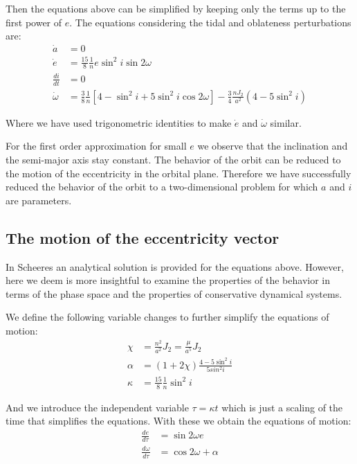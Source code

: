 Then the equations above can be simplified by keeping only the terms up to the first power of $e$. The equations considering the tidal and oblateness perturbations are:
\begin{align}
\dot{a} &= 0\\
\dot{e} &= \frac{15}{8} \frac{1}{n} e \sin^2 i \sin 2\omega\\
\frac{di}{dt} &= 0\\
\dot{\omega} &= \frac{3}{8} \frac{1}{n}\left[4 - \sin^2 i+ 5 \sin^2 i \cos 2\omega \right] -\frac{3}{4} \frac{n J_2 }{a^2} \left(4 - 5 \sin^2 i\right)
\end{align}

Where we have used trigonometric identities to make $\dot{e}$ and $\dot{\omega}$ similar.

For the first order approximation for small $e$ we observe that the inclination and the semi-major axis stay constant. The behavior of the orbit can be reduced to the motion of the eccentricity in the orbital plane. Therefore we have successfully reduced the behavior of the orbit to a two-dimensional problem for which $a$ and $i$ are parameters.

\subsection{The motion of the eccentricity vector}
In Scheeres \cite{scheeres2001stability} an analytical solution is provided for the equations above. However, here we deem is more insightful to examine the properties of the behavior in terms of the phase space and the properties of conservative dynamical systems.

We define the following variable changes to further simplify the equations of motion:
\begin{align}
\chi &= \frac{n^2}{a^2} J_2 = \frac{\mu}{a^5} J_2 \\
\alpha &= (1+ 2\chi) \frac{4 - 5 \sin^2 i}{5 sin^2 i} \\
\kappa &= \frac{15}{8} \frac{1}{n} \sin^2 i
\end{align}

And we introduce the independent variable $\tau = \kappa t$ which is just a scaling of the time that simplifies the equations. With these we obtain the equations of motion:
\begin{align}
\frac{de}{d\tau} &= \sin 2\omega e \\
\label{domegadtau}
\frac{d\omega}{d\tau} &= \cos 2\omega+ \alpha
\end{align}

